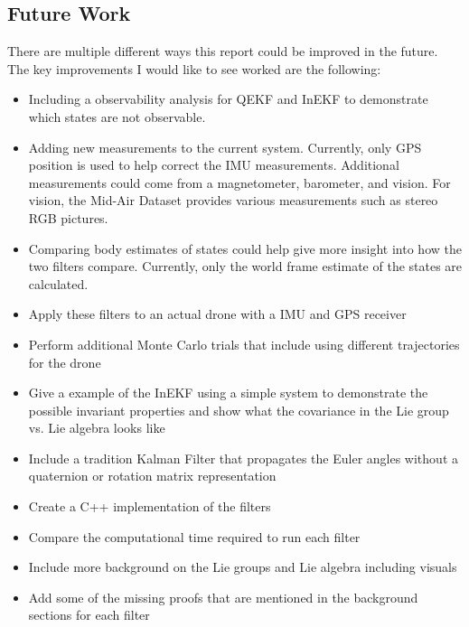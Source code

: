 \subsection{Future Work}
There are multiple different ways this report could be improved in the future. The key improvements I would like to see worked are the following:
\begin{itemize}
    \item Including a observability analysis for QEKF and InEKF to demonstrate which states are not observable.
    \item Adding new measurements to the current system. Currently, only GPS position is used to help correct the IMU measurements. Additional measurements could come from a magnetometer, barometer, and vision. For vision, the Mid-Air Dataset \cite{Fonder2019MidAir} provides various measurements such as stereo RGB pictures.
    \item Comparing body estimates of states could help give more insight into how the two filters compare. Currently, only the world frame estimate of the states are calculated.
    \item Apply these filters to an actual drone with a IMU and GPS receiver
    \item Perform additional Monte Carlo trials that include using different trajectories for the drone
    \item Give a example of the InEKF using a simple system to demonstrate the possible invariant properties and show what the covariance in the Lie group vs. Lie algebra looks like
    \item Include a tradition Kalman Filter that propagates the Euler angles without a quaternion or rotation matrix representation
    \item Create a C++ implementation of the filters
    \item Compare the computational time required to run each filter
    \item Include more background on the Lie groups and Lie algebra including visuals
    \item Add some of the missing proofs that are mentioned in the background sections for each filter
\end{itemize}

\clearpage
